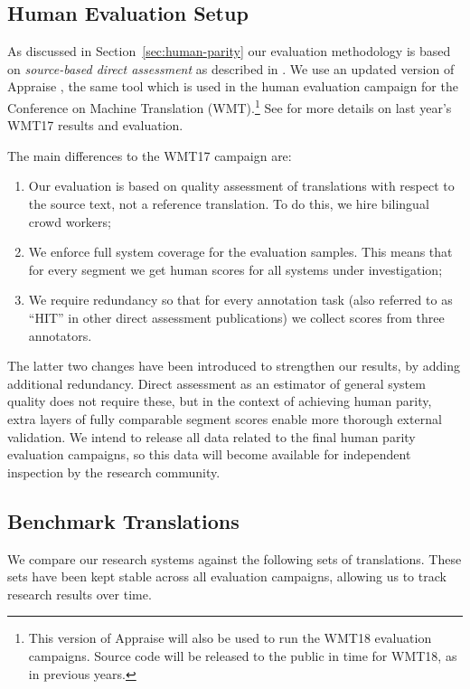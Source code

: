 \documentclass[a4paper]{article}
\begin{document}
\begin{CJK*}{UTF8}{gbsn}
\subsection{Human Evaluation Setup}

As discussed in Section~\ref{sec:human-parity} our evaluation methodology is based on \emph{source-based direct assessment} as described in \cite{IWSLT17}. We use an updated version of Appraise \cite{Appraise}, the same tool which is used in the human evaluation campaign for the Conference on Machine Translation (WMT).\footnote{This version of Appraise will also be used to run the WMT18 evaluation campaigns. Source code will be released to the public in time for WMT18, as in previous years.} See \cite{bojar-EtAl:2017:WMT1} for more details on last year's WMT17 results and evaluation.

\bigskip\noindent The main differences to the WMT17 campaign are:
\begin{enumerate}
\item Our evaluation is based on quality assessment of translations with respect to the source text, not a reference translation. To do this, we hire bilingual crowd workers;



\item We enforce full system coverage for the evaluation samples. This means that for every segment we get human scores for all systems under investigation;

\item We require redundancy so that for every annotation task (also referred to as ``HIT'' in other direct assessment publications) we collect scores from three annotators.
\end{enumerate}

The latter two changes have been introduced to strengthen our results, by adding additional redundancy. Direct assessment as an estimator of general system quality does not require these, but in the context of achieving human parity, extra layers of fully comparable segment scores enable more thorough external validation. We intend to release all data related to the final human parity evaluation campaigns, so this data will become available for independent inspection by the research community.

\subsection{Benchmark Translations}
\label{comparesystems}
We compare our research systems against the following sets of translations. These sets have been kept stable across all evaluation campaigns, allowing us to track research results over time.


\end{CJK*}
\end{document}
